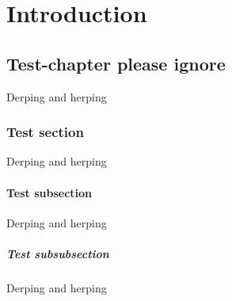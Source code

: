 \part{Introduction}
\chapter{Test-chapter please ignore}
Derping and herping
\section{Test section}
Derping and herping
\subsection{Test subsection}
Derping and herping
\subsubsection*{Test subsubsection}
Derping and herping

